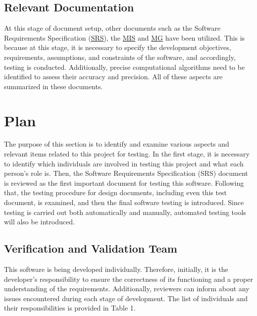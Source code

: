 \documentclass[12pt, titlepage]{article}
\begin{document}
\subsection{Relevant Documentation}

At this stage of document setup, other documents such as the Software Requirements Specification (\href{https://github.com/AtiyehSayadi/Centrality-In-Graphs/blob/main/docs/SRS/SRS.pdf}{SRS}),  the \href{https://github.com/AtiyehSayadi/Centrality-In-Graphs/blob/main/docs/Design/SoftDetailedDes/MIS.pdf}{MIS} and \href{https://github.com/AtiyehSayadi/Centrality-In-Graphs/blob/main/docs/Design/SoftArchitecture/MG.pdf}{MG} have been utilized. This is because at this stage, it is necessary to specify the development objectives, requirements, assumptions, and constraints of the software, and accordingly, testing is conducted. Additionally, precise computational algorithms need to be identified to assess their accuracy and precision. All of these aspects are summarized in these documents.


\section{Plan}
The purpose of this section is to identify and examine various aspects and relevant items related to this project for testing. In the first stage, it is necessary to identify which individuals are involved in testing this project and what each person's role is. Then, the Software Requirements Specification (SRS) document is reviewed as the first important document for testing this software. Following that, the testing procedure for design documents, including even this test document, is examined, and then the final software testing is introduced. Since testing is carried out both automatically and manually, automated testing tools will also be introduced.

\subsection{Verification and Validation Team}

This software is being developed individually. Therefore, initially, it is the developer's responsibility to ensure the correctness of its functioning and a proper understanding of the requirements. Additionally, reviewers can inform about any issues encountered during each stage of development. The list of individuals and their responsibilities is provided in Table 1.
\end{document}
